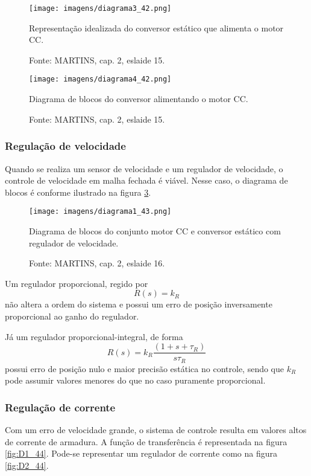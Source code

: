 \begin{figure}[ht!]
\center
\texttt{[image: imagens/diagrama3\_42.png]}
\caption{\label{fig:D3_42}Representação idealizada do conversor estático que alimenta o motor CC.}
\caption*{Fonte: MARTINS, cap. 2, eslaide 15.}
\end{figure}

\begin{figure}[ht!]
\center
\texttt{[image: imagens/diagrama4\_42.png]}
\caption{\label{fig:D1_42} Diagrama de blocos do conversor alimentando o motor CC.}
\caption*{Fonte: MARTINS, cap. 2, eslaide 15.}
\end{figure}

\subsubsection{Regulação de velocidade}

Quando se realiza um sensor de velocidade e um regulador de velocidade, o controle de velocidade em malha fechada é viável. Nesse caso, o diagrama de blocos é conforme ilustrado na figura \ref{fig:D1_43}.

\begin{figure}[ht!]
\center
\texttt{[image: imagens/diagrama1\_43.png]}
\caption{\label{fig:D1_43} Diagrama de blocos do conjunto motor CC e conversor estático com regulador de velocidade.}
\caption*{Fonte: MARTINS, cap. 2, eslaide 16.}
\end{figure} 
 
Um regulador proporcional, regido por
 \[R(s) = k_{R}\]
não altera a ordem do sistema e possui um erro de posição inversamente proporcional ao ganho do regulador.
 
Já um regulador proporcional-integral, de forma
\[R(s) = k_{R}\frac{\left(1+s+\tau_{R}\right)}{s\tau_{R}}\]
possui erro de posição nulo e maior precisão estática no controle, sendo que $k_{R}$ pode assumir valores menores do que no caso puramente proporcional.

\subsubsection{Regulação de corrente}

Com um erro de velocidade grande, o sistema de controle resulta em valores altos de corrente de armadura. A função de transferência é representada na figura \ref{fig:D1_44}. Pode-se representar um regulador de corrente como na figura \ref{fig:D2_44}.

